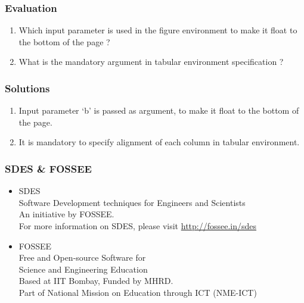 \documentclass[17pt,compress]{beamer}
\begin{document}
\begin{frame}[fragile]
\frametitle{Evaluation}
\begin{enumerate}
\item Which input parameter is used in the figure environment to make it float
      to the bottom of the page ?
\item What is the mandatory argument in tabular environment specification ?
\end{enumerate}
\end{frame}
\begin{frame}

\frametitle{Solutions}
\begin{enumerate}
\vspace{15pt}
\item Input parameter `b' is passed as argument, to make it float to the bottom
      of the page.
\item It is mandatory to specify alignment of each column in tabular 
      environment.
\end{enumerate}
\end{frame}

\begin{frame}
\frametitle{SDES \& FOSSEE}
\begin{center}
\begin{itemize}
\item \small{SDES}\\
\small{\color{LimeGreen}Software Development techniques for Engineers and Scientists} \\
\scriptsize An initiative by FOSSEE. \\
\vspace{3pt}
\scriptsize For more information on SDES, please visit {\color{blue}\url{http://fossee.in/sdes}}\\
\vspace{12pt}
\item \small{FOSSEE}\\
\small {\color{LimeGreen}Free and Open-source Software for \\Science and Engineering Education} \\
\scriptsize Based at IIT Bombay, Funded by MHRD.\\
\vspace{3pt}
\scriptsize Part of National Mission on Education through ICT (NME-ICT) \\
\end{itemize}
\end{center}
\end{frame}
\end{document}
